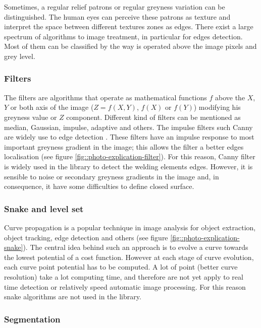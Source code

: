 \documentclass[12pt]{iopart}
\begin{document}
Sometimes, a regular relief patrons or regular greyness
 variation can be distinguished. The human eyes can perceive these patrons as texture 
and interpret the space between different textures zones as edges.
There exist a large spectrum of algorithms to image treatment, in particular for edges detection.
 Most of them can be classified by the way  is operated above the image pixels and grey level.

\subsubsection{Filters}
\label{filters}

The filters are algorithms that operate as mathematical functions $f$ above the 
$X$, $Y$ or both axis of the image ($Z = f(X,Y)$,  
$f(X)$ or $f(Y)$)  modifying his greyness value or $Z$ component. 
Different kind of filters can be mentioned as median, Gaussian, impulse,
 adaptive and others. The impulse filters such Canny are 
widely use to edge detection \cite{COCQUEREZ}. These filters have an
 impulse response to most important greyness gradient in the 
image; this allows the filter a better edges localisation
 (see figure \ref{fig::photo-explication-filter}). 
For this reason, Canny filter is widely 
used in the library to detect the welding elements edges. 
However, it is sensible to noise or secondary greyness gradients in the image
 and, in consequence, it have some difficulties to define closed surface.

\subsubsection{Snake and level set}
\label{snake_and_level_set}
 
Curve propagation is a popular technique in image analysis for object extraction,
 object tracking, edge detection and others (see figure 
\ref{fig::photo-explication-snake}). The central idea behind such an approach
 is to evolve a curve towards the lowest potential of a cost function. 
However at each stage of curve evolution, each curve point potential has
 to be computed. A lot of point (better curve resolution) take a lot 
computing time, and therefore are not yet apply to real time detection
 or relatively speed automatic image processing. For this reason snake algorithms are not used in the library.

\subsubsection{Segmentation}
\label{segmentation}
\end{document}
